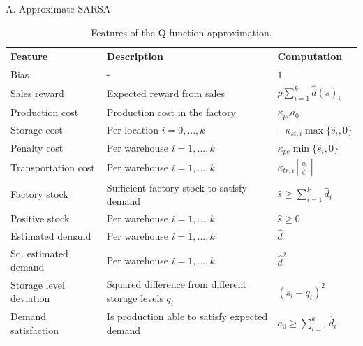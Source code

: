 \documentclass[journal, a4paper]{IEEEtran}
\theoremstyle{plain}
\theoremstyle{definition}
\begin{document}

\appendix
\label{appendixA}
A. Approximate SARSA
\begin{table}[h]
	\caption{\label{a_table}Features of the Q-function approximation.}
	\centering
	\begin{tabular}{p{2cm} p{3.2cm} l}
		\hline
		\textbf{Feature} & \textbf{Description} & \textbf{Computation}  \\
		\hline
		Bias        					& -             & $1$ \\
		Sales reward        	& Expected reward from sales             & $p \sum_{i=1}^{k}\hat{d}(\tilde{s})_i$ \\
		Production cost 	& Production cost in the factory								& $\kappa_{pr}a_0$ \\
		Storage cost		& Per location $i=0,...,k$					& $-\kappa_{st, i} \max\{\hat{s}_i, 0\}$\\
		Penalty cost		& Per warehouse $i = 1,...,k$		& $\kappa_{pe} \min\{\hat{s}_i, 0\}$ \\		
		Transportation cost & Per warehouse $i=1,...,k$ & 				$\kappa_{tr, i} \left\lceil \frac{a_i}{\zeta_i} \right\rceil$ \\
		Factory stock & Sufficient factory stock to satisfy demand & $\hat{s}\geq \sum_{i=1}^{k}\hat{d}_i $\\
		Positive stock & Per warehouse $i=1,...,k$ & $\hat{s}\geq 0 $ \\
		Estimated demand & Per warehouse $i=1,...,k$ & $\hat{d}$ \\
		Sq. estimated demand & Per warehouse $i=1,...,k$ & $\hat{d}^2$ \\
		Storage level deviation & {Squared difference from different storage levels $q_i$}  & $ (\hat{s}_i - q_i)^2$ \\
		Demand satisfaction & Is production able to satisfy expected demand & $a_0 \geq \sum_{i=1}^{k}\hat{d}_i$ \\
		\hline
	\end{tabular}
\end{table}

\end{document}
